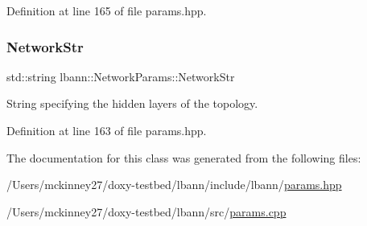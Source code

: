 Definition at line 165 of file params.\+hpp.

\mbox{\label{classlbann_1_1NetworkParams_a8b503690c7475582b5a843f0959c3f2a}} 
\subsubsection{\texorpdfstring{Network\+Str}{NetworkStr}}
{\footnotesize\ttfamily std\+::string lbann\+::\+Network\+Params\+::\+Network\+Str}



String specifying the hidden layers of the topology. 



Definition at line 163 of file params.\+hpp.



The documentation for this class was generated from the following files\+:\begin{DoxyCompactItemize}
\item 
/\+Users/mckinney27/doxy-\/testbed/lbann/include/lbann/\hyperlink{params_8hpp}{params.\+hpp}\item 
/\+Users/mckinney27/doxy-\/testbed/lbann/src/\hyperlink{params_8cpp}{params.\+cpp}\end{DoxyCompactItemize}
